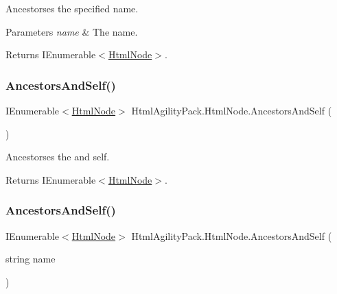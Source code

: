 Ancestorses the specified name. 


\begin{DoxyParams}{Parameters}
{\em name} & The name.\\
\hline
\end{DoxyParams}
\begin{DoxyReturn}{Returns}
I\+Enumerable$<$\hyperlink{class_html_agility_pack_1_1_html_node}{Html\+Node}$>$.
\end{DoxyReturn}
\mbox{\label{class_html_agility_pack_1_1_html_node_aa344c3c6ea4ef0a752f4129ba22c23fc}} 
\subsubsection{\texorpdfstring{Ancestors\+And\+Self()}{AncestorsAndSelf()}\hspace{0.1cm}{\footnotesize\ttfamily [1/2]}}
{\footnotesize\ttfamily I\+Enumerable$<$\hyperlink{class_html_agility_pack_1_1_html_node}{Html\+Node}$>$ Html\+Agility\+Pack.\+Html\+Node.\+Ancestors\+And\+Self (\begin{DoxyParamCaption}{ }\end{DoxyParamCaption})\hspace{0.3cm}{\ttfamily [inline]}}



Ancestorses the and self. 

\begin{DoxyReturn}{Returns}
I\+Enumerable$<$\hyperlink{class_html_agility_pack_1_1_html_node}{Html\+Node}$>$.
\end{DoxyReturn}
\mbox{\label{class_html_agility_pack_1_1_html_node_a674b0a3eb47a448295668c859495c297}} 
\subsubsection{\texorpdfstring{Ancestors\+And\+Self()}{AncestorsAndSelf()}\hspace{0.1cm}{\footnotesize\ttfamily [2/2]}}
{\footnotesize\ttfamily I\+Enumerable$<$\hyperlink{class_html_agility_pack_1_1_html_node}{Html\+Node}$>$ Html\+Agility\+Pack.\+Html\+Node.\+Ancestors\+And\+Self (\begin{DoxyParamCaption}\item[{string}]{name }\end{DoxyParamCaption})\hspace{0.3cm}{\ttfamily [inline]}}




